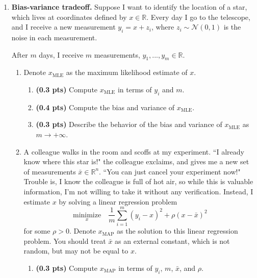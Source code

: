 \documentclass{article}
\newcommand{\minimize}[1]{\underset{#1}{\text{minimize}}}
\newcommand{\R}{\mathbb R}
\newcommand{\mN}{\mathcal N}
\newcommand{\showpoints}[1]{\textbf{(#1 pts)}}
\begin{document}
\begin{enumerate}
\begin{enumerate}
 
\end{enumerate}






\item \textbf{Bias-variance tradeoff.}
Suppose I want to identify the location of a star, which lives at coordinates defined by $x\in \R$. Every day I go to the telescope, and I receive a new measurement $y_i = x + z_i$, where $z_i \sim \mN(0,1)$ is the noise in each measurement.

After $m$ days, I receive $m$ measurements, $y_1,...,y_m  \in \R$.

\begin{enumerate}
\item Denote $x_{\mathrm{MLE}}$ as the maximum likelihood estimate of $x$. 

\begin{enumerate}
\item \showpoints{0.3} Compute $x_{\mathrm{MLE}}$ in terms of $y_i$ and $m$.

\item  \showpoints{0.4} Compute the bias and variance of $x_{\mathrm{MLE}}$. 


\item \showpoints{0.3} Describe the behavior of the bias and variance of $x_{\mathrm{MLE}}$ as $m\to +\infty$.



\end{enumerate}
\item A colleague walks in the room and scoffs at my experiment. ``I already know where this star is!" the colleague exclaims, and gives me a new set of measurements $\bar x\in \R^n$. ``You can just cancel your experiment now!" Trouble is, I know the colleague is full of hot air, so while this is valuable information, I'm not willing to take it without any verification. Instead, I estimate $x$ by solving a linear regression problem 
\[
\minimize{x} \quad \frac{1}{m}\sum_{i=1}^m (y_i-x)^2 + \rho (x-\bar x)^2
\]
for some $\rho > 0$.
Denote $x_{\mathrm{MAP}}$ as the solution to this linear regression problem. 
You should treat $\bar x$ as an external constant, which is not random, but may not be equal to $x$.



\begin{enumerate}
\item \showpoints{0.3} Compute $x_{\mathrm{MAP}}$ in terms of $y_i$, $m$, $\bar x$, and $\rho$.



\end{enumerate}
\end{enumerate}
\end{enumerate}
\end{document}
